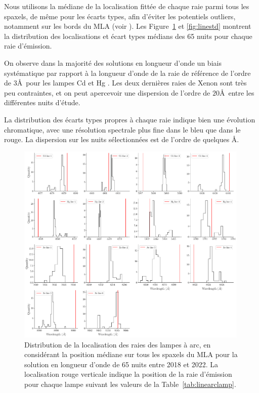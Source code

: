 \documentclass[../main/main.tex]{subfiles}
\begin{document}
Nous utilisons la médiane de la localisation fittée de chaque raie
parmi tous les
spaxels, de même pour les écarts types, afin d'éviter les potentiels
outliers, notamment sur les bords du MLA (voir \citet{pysedm}). Les Figure~\ref{fig:lineloc} et
\ref{fig:linestd} montrent la distribution des localisations et écart
types médians des 65 nuits pour chaque raie d'émission.

On observe dans
la majorité des solutions en longueur d'onde un biais systématique par
rapport à la longueur d'onde de la raie de référence de l'ordre de
$3$\AA\ pour les lampes Cd et Hg . Les deux dernières raies de Xenon sont très peu contraintes, et
on peut apercevoir une dispersion de l'ordre de $20$\AA\ entre les
différentes nuits d'étude. 

La distribution des écarts types propres à chaque raie indique bien une
évolution chromatique, avec une résolution spectrale plus fine dans le
bleu que dans le rouge. La dispersion sur les nuits sélectionnées est de
l'ordre de quelques \AA.

\begin{figure}[h!]
  \centering
  \includegraphics[width=0.99\textwidth]{../figures/06_irf/lineloc.pdf}
  \caption[Distribution de la localisation des raies des lampes à
  arc]{Distribution de la localisation des raies des lampes à arc, en
    considérant la position médiane sur tous les spaxels du MLA pour la
    solution en longueur d'onde de 65 nuits entre 2018 et 2022. La
    localisation rouge verticale indique la position de la raie
    d'émission pour
    chaque lampe suivant les valeurs de la
    Table~\ref{tab:linearclamp}.}
  \label{fig:lineloc}
\end{figure}
\end{document}
